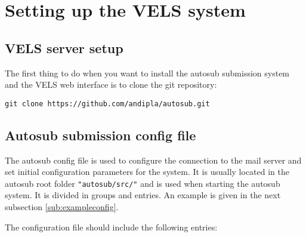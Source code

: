 \section{Setting up the VELS system} \label{setup}

\subsection{VELS server setup} \label{sub:serversetup}

The first thing to do when you want to install the autosub submission system and the VELS
web interface is to clone the git repository:

\begin{verbatim}
git clone https://github.com/andipla/autosub.git
\end{verbatim}

\subsection{Autosub submission config file}\label{sub:configfile}
The autosub config file is used to configure the connection to the mail server and set
initial configuration parameters for the system. It is usually located in the autosub root
folder {\tt "autosub/src/"} and is used when starting the autosub system. It is divided
in groups and entries. An example is given in the next subsection \ref{sub:exampleconfig}.

The configuration file should include the following entries:

